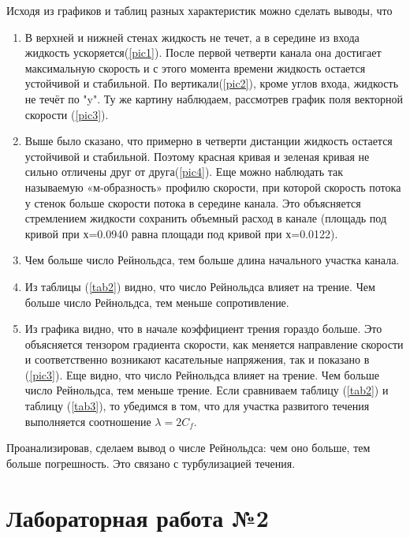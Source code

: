 \documentclass[12pt, a4paper]{article}
\begin{document}
Исходя из графиков и таблиц разных характеристик можно сделать выводы, что
\begin{enumerate}
    \item
        В верхней и нижней стенах жидкость не течет, а в середине из входа жидкость ускоряется(\ref{pic1}). После первой четверти канала она достигает максимальную скорость и с этого момента времени жидкость остается устойчивой и стабильной. По вертикали(\ref{pic2}), кроме углов входа, жидкость не течёт по "y". Ту же картину наблюдаем, рассмотрев график поля векторной скорости (\ref{pic3}).
    \item
        Выше было сказано, что примерно в четверти дистанции жидкость остается устойчивой и стабильной. Поэтому красная кривая и зеленая кривая не сильно отличены друг от друга(\ref{pic4}). Еще можно наблюдать так называемую «м-образность» профилю скорости, при которой скорость потока у стенок больше скорости потока в середине канала. Это объясняется стремлением жидкости сохранить объемный расход в канале (площадь под кривой при х=0.0940 равна площади под кривой при х=0.0122).
    \item
        Чем больше число Рейнольдса, тем больше длина начального участка канала.
    \item
        Из таблицы (\ref{tab2}) видно, что число Рейнольдса влияет на трение. Чем больше число Рейнольдса, тем меньше сопротивление.
    \item
        Из графика видно, что в начале коэффициент трения гораздо больше. Это объясняется тензором градиента скорости, как меняется направление скорости и соответственно возникают касательные напряжения, так и показано в (\ref{pic3}). Еще видно, что число Рейнольдса влияет на трение. Чем больше число Рейнольдса, тем меньше трение. Если сравниваем таблицу (\ref{tab2}) и таблицу (\ref{tab3}), то убедимся в том, что для участка развитого течения выполняется соотношение $\lambda = 2 C_f$.
\end{enumerate}
Проанализировав, сделаем вывод о числе Рейнольдса: чем оно больше, тем больше погрешность. Это связано с турбулизацией течения.

\newpage
\section{Лабораторная работа №2}
\end{document}
